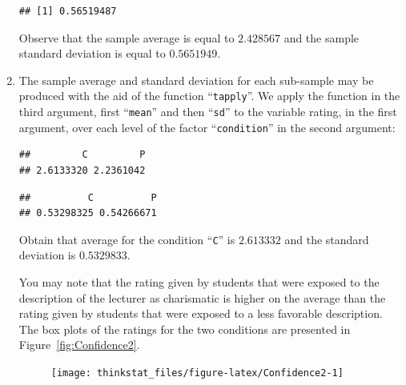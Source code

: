 \documentclass[]{krantz}
\makeatletter
\newenvironment{Shaded}{\begin{snugshade}}{\end{snugshade}}
\newcommand{\KeywordTok}[1]{\textcolor[rgb]{0.13,0.29,0.53}{\textbf{#1}}}
\newcommand{\OperatorTok}[1]{\textcolor[rgb]{0.81,0.36,0.00}{\textbf{#1}}}
\newcommand{\NormalTok}[1]{#1}
\newenvironment{kframe}{%
\medskip{}
\setlength{\fboxsep}{.8em}
 \def\at@end@of@kframe{}%
 \ifinner\ifhmode%
  \def\at@end@of@kframe{\end{minipage}}%
  \begin{minipage}{\columnwidth}%
 \fi\fi%
 \def\FrameCommand##1{\hskip\@totalleftmargin \hskip-\fboxsep
 \colorbox{shadecolor}{##1}\hskip-\fboxsep
     \hskip-\linewidth \hskip-\@totalleftmargin \hskip\columnwidth}%
 \MakeFramed {\advance\hsize-\width
   \@totalleftmargin\z@ \linewidth\hsize
   \@setminipage}}%
 {\par\unskip\endMakeFramed%
 \at@end@of@kframe}
\renewenvironment{Shaded}{\begin{kframe}}{\end{kframe}}
\theoremstyle{definition}
\theoremstyle{definition}
\theoremstyle{definition}
\theoremstyle{remark}
\makeatother
\begin{document}
\begin{enumerate}
\begin{verbatim}
## [1] 0.56519487
\end{verbatim}

  Observe that the sample average is equal to \(2.428567\) and the
  sample standard deviation is equal to \(0.5651949\).
\item
  The sample average and standard deviation for each sub-sample may be
  produced with the aid of the function ``\texttt{tapply}''. We apply
  the function in the third argument, first ``\texttt{mean}'' and then
  ``\texttt{sd}'' to the variable rating, in the first argument, over
  each level of the factor ``\texttt{condition}'' in the second
  argument:

\begin{Shaded}
\end{Shaded}

\begin{verbatim}
##         C         P 
## 2.6133320 2.2361042
\end{verbatim}

\begin{Shaded}
\end{Shaded}

\begin{verbatim}
##          C          P 
## 0.53298325 0.54266671
\end{verbatim}

  Obtain that average for the condition ``\texttt{C}'' is \(2.613332\)
  and the standard deviation is \(0.5329833\).

  You may note that the rating given by students that were exposed to
  the description of the lecturer as charismatic is higher on the
  average than the rating given by students that were exposed to a less
  favorable description. The box plots of the ratings for the two
  conditions are presented in Figure~\ref{fig:Confidence2}.

  \begin{figure}

  {\centering \texttt{[image: thinkstat\_files/figure-latex/Confidence2-1]} 

}
\end{figure}
\end{enumerate}
\end{document}
